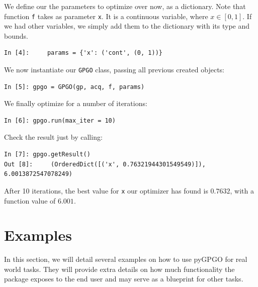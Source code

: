 \documentclass[10pt,a4paper,twoside]{book}
\begin{document}
We define our the parameters to optimize over now, as a dictionary. Note that function \texttt{f} takes as parameter \texttt{x}. It is a continuous variable, where $x\in \left[0, 1\right]$. If we had other variables, we simply add them to the dictionary with its type and bounds.

\begin{verbatim}
In [4]:     params = {'x': ('cont', (0, 1))}
\end{verbatim}

We now instantiate our \texttt{GPGO} class, passing all previous created objects:

\begin{verbatim}
In [5]:	gpgo = GPGO(gp, acq, f, params)
\end{verbatim}

We finally optimize for a number of iterations:

\begin{verbatim}
In [6]: gpgo.run(max_iter = 10)               
\end{verbatim}

Check the result just by calling:

\begin{verbatim}
In [7]: gpgo.getResult()
Out [8]:	 (OrderedDict([('x', 0.76321944301549549)]), 6.0013872547078249)
\end{verbatim}

After 10 iterations, the best value for \texttt{x} our optimizer has found is $0.7632$, with a function value of $6.001$.

\section{Examples}

In this section, we will detail several examples on how to use pyGPGO for real world tasks. They will provide extra details on how much functionality the package exposes to the end user and may serve as a blueprint for other tasks.
\end{document}
